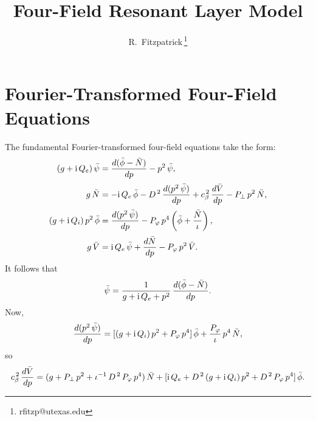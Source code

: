 \documentclass[12pt,prb,aps,notitlepage]{revtex4-1}
\begin{document}
\title{Four-Field Resonant Layer Model}
\author{R.~Fitzpatrick\,\footnote{rfitzp@utexas.edu}}
\begin{abstract}
\end{abstract}
\maketitle

\section{Fourier-Transformed Four-Field Equations}
The fundamental Fourier-transformed four-field equations take the form:
\begin{align}
(g+{\rm i}\,Q_e)\,\bar{\psi} &= \frac{d(\bar{\phi}-\bar{N})}{dp} - p^2\,\bar{\psi},\\[0.5ex]
g\,\bar{N} &= -{\rm i}\,Q_e\,\bar{\phi} - D^{\,2}\,\frac{d(p^2\,\bar{\psi})}{dp} + c_\beta^{\,2}\,\frac{d\bar{V}}{dp} - P_\perp\,p^2\,\bar{N},\\[0.5ex]
(g+ {\rm i}\,Q_i)\,p^2\,\bar{\phi} &= \frac{d(p^2\,\bar{\psi})}{dp} - P_\varphi\,p^4\left(\bar{\phi}+ \frac{\bar{N}}{\iota}\right),\\[0.5ex]
g\,\bar{V} &= {\rm i}\,Q_e\,\bar{\psi} + \frac{d\bar{N}}{dp} - P_\varphi\,p^2\,\bar{V}.
\end{align}
It follows that
\begin{equation}
\bar{\psi} = \frac{1}{g+{\rm i}\,Q_e+p^2}\,\frac{d(\bar{\phi}-\bar{N})}{dp}.
\end{equation}
Now,
\begin{equation}
\frac{d(p^2\,\bar{\psi})}{dp} = [(g+{\rm i}\,Q_i)\,p^2 + P_\varphi\,p^4]\,\bar{\phi} + \frac{P_\varphi}{\iota}\,p^4\,\bar{N},
\end{equation}
so
\begin{equation}
c_\beta^{\,2}\,\frac{d\bar{V}}{dp} = (g + P_\perp\,p^2+ \iota^{-1}\,D^{\,2}\,P_\varphi\,p^4)\,\bar{N}+ [
{\rm i}\,Q_e + D^{\,2}\,(g+{\rm i}\,Q_i)\,p^2 + D^{\,2}\,P_\varphi\,p^4]\,\bar{\phi}.
\end{equation}
\end{document}
